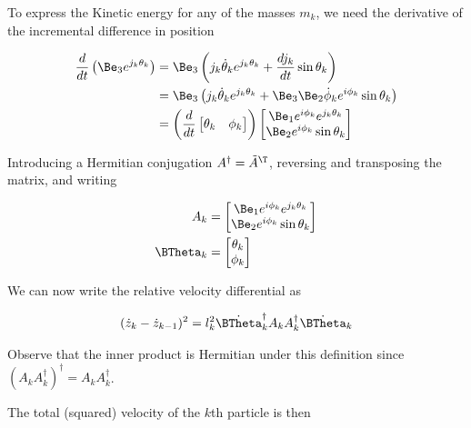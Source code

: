 To express the Kinetic energy for any of the masses $m_k$, we need the derivative of the incremental difference in position

\begin{align*}
\frac{d}{dt} \left( \Be_3 e^{j_k \theta_k} \right)
&=
\Be_3 \left( j_k \dot{\theta}_k e^{j_k \theta_k} + \frac{d j_k }{dt} \sin\theta_k \right)  \\
&=
\Be_3 \left( j_k \dot{\theta}_k e^{j_k \theta_k} + \Be_3 \Be_2 \dot{\phi}_k e^{i \phi_k} \sin\theta_k \right)  \\
&=
\left( \frac{d}{dt}
\begin{bmatrix}
\theta_k & \phi_k
\end{bmatrix} \right)
\begin{bmatrix}
\Be_1 e^{i \phi_k} e^{j_k \theta_k} \\
\Be_2 e^{i \phi_k} \sin\theta_k
\end{bmatrix}
\end{align*}

Introducing a Hermitian conjugation $A^\dagger = \tilde{A}^\T$, reversing and transposing the matrix, and writing

\begin{align}\label{eqn:multiPendulumSpherical2:boo2}
A_k &=
\begin{bmatrix}
\Be_1 e^{i \phi_k} e^{j_k \theta_k} \\
\Be_2 e^{i \phi_k} \sin\theta_k
\end{bmatrix} \\
\BTheta_k &=
\begin{bmatrix}
\theta_k \\
\phi_k
\end{bmatrix}
\end{align}

We can now write the relative velocity differential as

\begin{align}\label{eqn:multiPendulumSpherical2:boo3}
(\dot{z}_k - \dot{z}_{k-1})^2 = l_k^2 {\dot{\BTheta}_k}^\dagger A_k A_k^\dagger \dot{\BTheta}_k
\end{align}

Observe that the inner product is Hermitian under this definition since $(A_k A_k^\dagger)^\dagger = A_k A_k^\dagger$.

The total (squared) velocity of the $k$th particle is then

